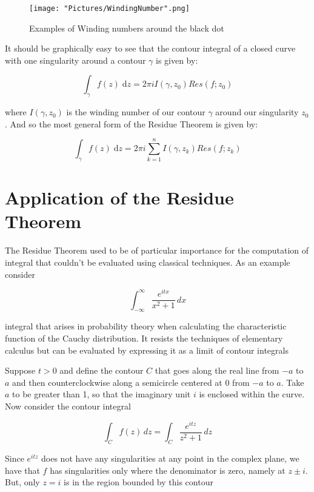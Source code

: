 \documentclass[12pt, letterpaper]{article}
\begin{document}
\begin{figure}[h]
    \centering
    \texttt{[image: "Pictures/WindingNumber".png]}
    \caption{Examples of Winding numbers around the black dot}
    \label{fig:my_label4}
\end{figure}

\noindent
It should be graphically easy to see that the contour integral of a closed curve with one singularity around a contour \(\gamma\) is given by:

\[\int_{\gamma}^{} f(z) \;\mathrm{d}z = 2\pi i I(\gamma, z_{0})Res(f;z_{0}) \]

\noindent
where \(I(\gamma,z_{0})\) is the winding number of our contour \(\gamma\) around our singularity \(z_{0}\). And so the most general form of the Residue Theorem is given by:

\[\int_{\gamma}^{} f(z) \;\mathrm{d}z = 2\pi i \sum_{k=1}^{n} I(\gamma,z_{k})Res(f;z_{k}) \]
\bigskip

\section*{Application of the Residue Theorem}

\noindent
The Residue Theorem used to be of particular importance for the computation of integral that couldn't be evaluated using classical techniques. As an example consider 

\[\int_{-\infty}^\infty \frac{e^{itx}}{x^2+1}\,dx \]

\noindent
integral that arises in probability theory when calculating the characteristic function of the Cauchy distribution. It resists the techniques of elementary calculus but can be evaluated by expressing it as a limit of contour integrals
\bigskip

\noindent
Suppose \(t > 0\) and define the contour \(C\) that goes along the real line from \( -a \) to \( a \) and then counterclockwise along a semicircle centered at 0 from \( -a \) to \( a \). Take \(a\) to be greater than 1, so that the imaginary unit \(i\) is enclosed within the curve.  Now consider the contour integral

\[ \int_C {f(z)}\,dz =\int_C \frac{e^{itz}}{z^2+1}\,dz \]

\noindent
Since \(e^{itz}\) does not have any singularities at any point in the complex plane, we have that \(f\) has singularities only where the denominator is zero, namely at \(z \pm i \). But, only \(z = i\) is in the region bounded by this contour
\end{document}
